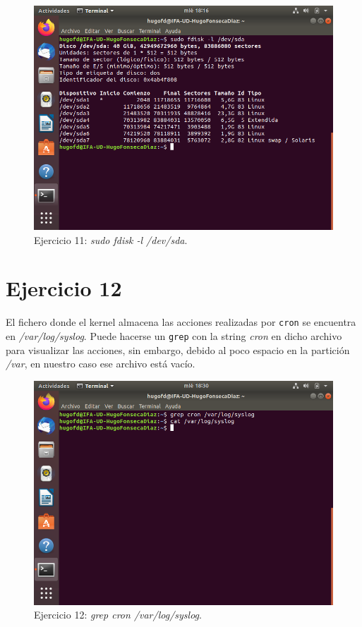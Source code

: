 \documentclass[11pt]{article}
\begin{document}
\begin{figure}[H]
    \caption{Ejercicio 11: \textit{sudo fdisk -l /dev/sda}.}
  \centering
  \includegraphics{e11.png}
\end{figure}

\section{Ejercicio 12}
El fichero donde el kernel almacena las acciones realizadas por \verb|cron| se encuentra en \textit{/var/log/syslog}. Puede hacerse un \verb|grep| con la string \textit{cron} en dicho archivo para visualizar las acciones, sin embargo, debido al poco espacio en la partición \textit{/var}, en nuestro caso ese archivo está vacío.

\begin{figure}[H]
    \caption{Ejercicio 12: \textit{grep cron /var/log/syslog}.}
  \centering
  \includegraphics{e12.png}
\end{figure}
\end{document}
